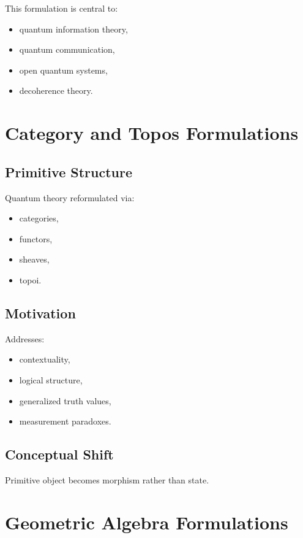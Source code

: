 \documentclass[11pt]{article}
\begin{document}
This formulation is central to:

\begin{itemize}
\item quantum information theory,
\item quantum communication,
\item open quantum systems,
\item decoherence theory.
\end{itemize}

\section{Category and Topos Formulations}

\subsection{Primitive Structure}

Quantum theory reformulated via:

\begin{itemize}
\item categories,
\item functors,
\item sheaves,
\item topoi.
\end{itemize}

\subsection{Motivation}

Addresses:

\begin{itemize}
\item contextuality,
\item logical structure,
\item generalized truth values,
\item measurement paradoxes.
\end{itemize}

\subsection{Conceptual Shift}

Primitive object becomes morphism rather than state.

\section{Geometric Algebra Formulations}
\end{document}
